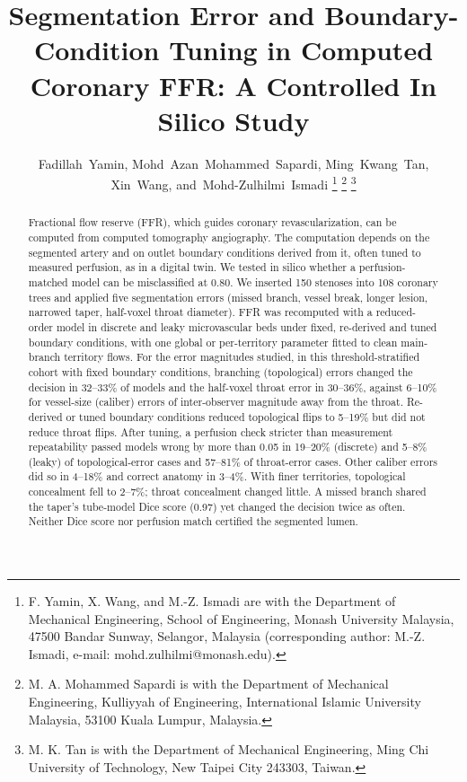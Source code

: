 \documentclass[journal,twoside,web]{ieeecolor}
\begin{document}

\title{Segmentation Error and Boundary-Condition Tuning in Computed Coronary FFR: A Controlled In Silico Study}

\author{Fadillah~Yamin,
        Mohd~Azan~Mohammed~Sapardi,
        Ming~Kwang~Tan,
        Xin~Wang,
        and~\mbox{Mohd-Zulhilmi~Ismadi}\endgraf\vspace{-\baselineskip}%
\thanks{F. Yamin, X. Wang, and M.-Z. Ismadi are with the Department of Mechanical Engineering, School of
Engineering, Monash University Malaysia, 47500 Bandar Sunway, Selangor, Malaysia (corresponding author:
M.-Z. Ismadi, e-mail: mohd.zulhilmi@monash.edu).}%
\thanks{M. A. Mohammed Sapardi is with the Department of Mechanical Engineering, Kulliyyah of Engineering,
International Islamic University Malaysia, 53100 Kuala Lumpur, Malaysia.}%
\thanks{M. K. Tan is with the Department of Mechanical Engineering, Ming Chi University of Technology, New Taipei
City 243303, Taiwan.}}


\maketitle

\begin{abstract}
Fractional flow reserve (FFR), which guides coronary revascularization, can be computed from computed tomography
angiography. The computation depends on the segmented artery and on outlet boundary conditions derived from it,
often tuned to measured perfusion, as in a digital twin. We tested in silico whether a perfusion-matched model can be
misclassified at 0.80. We inserted 150 stenoses into 108 coronary trees and applied five segmentation errors (missed branch, vessel break, longer lesion, narrowed taper, half-voxel throat diameter). FFR was recomputed with a reduced-order model in
discrete and leaky microvascular beds under fixed, re-derived and tuned boundary conditions,
with one global or per-territory parameter fitted to clean main-branch territory flows. For the error magnitudes studied, in this threshold-stratified cohort with fixed boundary conditions,
branching (topological) errors changed the decision in 32--33\% of models and the half-voxel throat error in
30--36\%, against 6--10\% for vessel-size (caliber) errors of inter-observer magnitude away from the throat.
Re-derived or tuned boundary conditions reduced topological flips to 5--19\% but did not reduce throat flips. After tuning, a perfusion check stricter than measurement repeatability passed models wrong by more than 0.05 in
19--20\% (discrete) and 5--8\% (leaky) of topological-error cases and 57--81\% of throat-error cases. Other caliber
errors did so in 4--18\% and correct anatomy in 3--4\%. With finer territories, topological concealment fell to
2--7\%; throat concealment changed little. A missed branch shared the taper's tube-model Dice score (0.97) yet changed the decision twice as often.
Neither Dice score nor perfusion match certified the segmented lumen.
\end{abstract}
\end{document}
